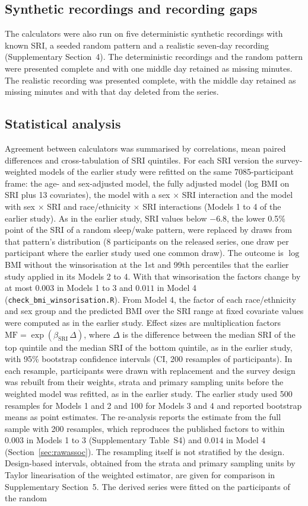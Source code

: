 \documentclass[12pt]{article}
\begin{document}
\subsection{Synthetic recordings and recording gaps}
\label{sec:gaps}
The calculators were also run on five deterministic synthetic recordings with known SRI, a seeded random pattern and a realistic seven-day recording (Supplementary Section~4). The deterministic recordings and the random pattern were presented complete and with one middle day retained as missing minutes. The realistic recording was presented complete, with the middle day retained as missing minutes and with that day deleted from the series.

\subsection{Statistical analysis}
Agreement between calculators was summarised by correlations, mean paired
differences and cross-tabulation of SRI quintiles. For each SRI version the
survey-weighted models of the earlier study were refitted on the same
7085-participant frame: the age- and sex-adjusted model, the fully adjusted
model (log BMI on SRI plus 13 covariates), the model with a sex $\times$ SRI
interaction and the model with sex $\times$ SRI and race/ethnicity $\times$
SRI interactions (Models 1 to 4 of the earlier study). As in the earlier study, SRI values below $-6.8$, the lower 0.5\% point of the SRI of a random sleep/wake pattern, were replaced by draws from that pattern's distribution (8 participants on the released series, one draw per participant where the earlier study used one common draw). The outcome is $\log$ BMI without the winsorisation at the 1st and 99th percentiles that the earlier study applied in its Models 2 to 4. With that winsorisation the factors change by at most $0.003$ in Models 1 to 3 and $0.011$ in Model 4 (\texttt{check\_bmi\_winsorisation.R}). From Model 4, the
factor of each race/ethnicity and sex group and the predicted BMI over the
SRI range at fixed covariate values were computed as in the earlier study.
Effect sizes are multiplication factors
$\mathrm{MF}=\exp(\beta_{\mathrm{SRI}}\,\Delta)$, where $\Delta$ is the difference between the median SRI of the top quintile and the median SRI of the bottom quintile, as in the earlier study, with 95\% bootstrap confidence intervals (CI, 200 resamples of participants). In each resample, participants were drawn with replacement and the survey design was rebuilt from their weights, strata and primary sampling units before the weighted model was refitted, as in the earlier study. The earlier study used 500 resamples for Models 1 and 2 and 100 for Models 3 and 4 and reported bootstrap means as point estimates. The re-analysis reports the estimate from the full sample with 200 resamples, which reproduces the published factors to within $0.003$ in Models 1 to 3 (Supplementary Table~S4) and $0.014$ in Model 4 (Section~\ref{sec:rawassoc}). The resampling itself is not stratified by the design. Design-based intervals, obtained from the strata and primary sampling units by Taylor linearisation of the weighted estimator, are given for comparison in Supplementary Section~5. The derived series were fitted on the participants of the random
\end{document}
